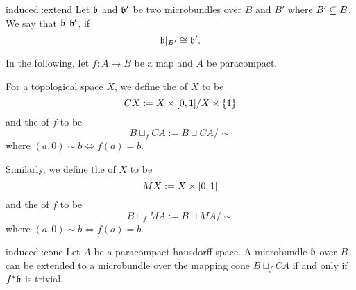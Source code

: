 \begin{mydefinition}{induced::extend}
    Let $\mathfrak{b}$ and $\mathfrak{b}'$ be two microbundles over $B$ and $B'$ where $B' \subseteq{} B$.
    We say that $\mathfrak{b}$  $\mathfrak{b}'$, if
    \[ \mathfrak{b}\vert_{B'} \cong \mathfrak{b}'. \]
\end{mydefinition}

\begin{myparagraph}
    In the following, let $f: A \to B$ be a map and $A$ be paracompact.
    
    For a topological space $X$, we define the  of $X$ to be 
    \[ CX := X \times{} [0, 1] / X \times \{1\} \]
    and the  of $f$ to be
    \[ B \sqcup_f CA := B \sqcup CA / \sim \]
    where $(a, 0) \sim b \iff f(a) = b$.
    
    Similarly, we define the  of $X$ to be
    \[ MX := X \times{} [0, 1] \]
    and the  of $f$ to be
    \[ B \sqcup_f MA := B \sqcup MA / \sim \]
    where $(a, 0) \sim b \iff f(a) = b$.
\end{myparagraph}

\begin{mylemma}{induced::cone}
    Let $A$ be a paracompact hausdorff space.
    A microbundle $\mathfrak{b}$ over $B$ can be extended to a microbundle
    over the mapping cone $B \sqcup_f CA$ if and only if $f^*\mathfrak{b}$ is trivial.
\end{mylemma}

